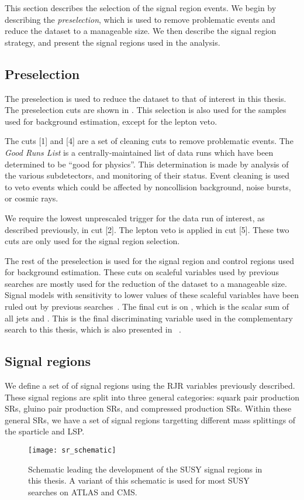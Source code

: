 This section describes the selection of the signal region events.
We begin by describing the \textit{preselection}, which is used to remove problematic events and reduce the dataset to a manageable size.
We then describe the signal region strategy, and present the signal regions used in the analysis.

\subsection{Preselection}

The preselection is used to reduce the dataset to that of interest in this thesis.
The preselection cuts are shown in .
This selection is also used for the samples used for background estimation, except for the lepton veto.

The cuts [1] and [4] are a set of cleaning cuts to remove problematic events.
The \textit{Good Runs List} is a centrally-maintained list of data runs which have been determined to be ``good for physics''.
This determination is made by analysis of the various subdetectors, and monitoring of their status.
Event cleaning is used to veto events which could be affected by noncollision background, noise bursts, or cosmic rays.

We require the lowest unprescaled \met trigger for the data run of interest, as described previously, in cut [2].
The lepton veto is applied in cut [5].
These two cuts are only used for the signal region selection.

The rest of the preselection is used for the signal region and control regions used for background estimation.
These cuts on scaleful variables used by previous searches are mostly used for the reduction of the dataset to a manageable size.
Signal models with sensitivity to lower values of these scaleful variables have been ruled out by previous searches~\cite{SUSY-2015-06}.
The final cut is on \meff, which is the scalar sum of all jets and \met.
This is the final discriminating variable used in the complementary search to this thesis, which is also presented in ~\cite{ATLAS-CONF-2016-078}.



\subsection{Signal regions}
We define a set of of signal regions using the RJR variables previously described.
These signal regions are split into three general categories: squark pair production SRs, gluino pair production SRs, and compressed production SRs.
Within these general SRs, we have a set of signal regions targetting different mass splittings of the sparticle and LSP.
\begin{figure}
\caption{Schematic leading the development of the SUSY signal regions in this thesis.
A variant of this schematic is used for most SUSY searches on ATLAS and CMS.
} \label{fig:sr_schematic}
\texttt{[image: sr\_schematic]}
\end{figure}

